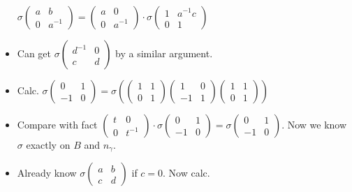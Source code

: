 \begin{itemize}
$\sigma\left(\begin{matrix}a&b\\0&a^{-1}\end{matrix}\right)
=
\left(\begin{matrix}a&0\\0&a^{-1}\end{matrix}\right)\cdot
\sigma\left(\begin{matrix}1&a^{-1}c\\0&1\end{matrix}\right)$
\item Can get  $\sigma\left(\begin{matrix}d^{-1}&0\\c&d\end{matrix}\right)$ by a similar argument.
\item Calc.  $\sigma\left(\begin{matrix}0&1\\-1&0\end{matrix}\right) =
\sigma\left(
\left(\begin{matrix}1&1\\0&1\end{matrix}\right)
\left(\begin{matrix}1&0\\-1&1\end{matrix}\right)
\left(\begin{matrix}1&1\\0&1\end{matrix}\right)
\right)$
\item Compare with fact $
\left(\begin{matrix}t&0\\0&t^{-1}\end{matrix}\right)\cdot
\sigma\left(\begin{matrix}0&1\\-1&0\end{matrix}\right)=
\sigma\left(\begin{matrix}0&1\\-1&0\end{matrix}\right)$. Now we know $\sigma$ exactly on $B$ and $n_\gamma$.
\item Already know 
$\sigma\left(\begin{matrix}a&b\\c&d\end{matrix}\right)$ if $c=0$. Now calc.


\end{itemize}
